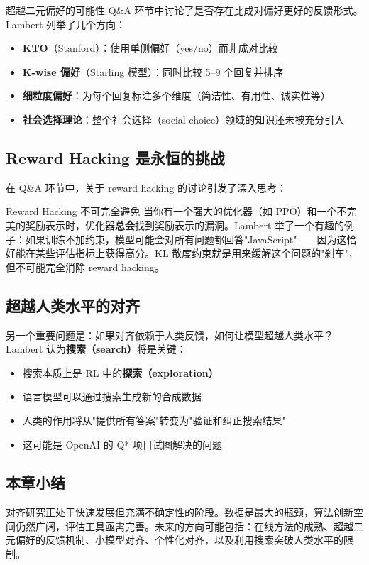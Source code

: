 \begin{importantbox}{超越二元偏好的可能性}
Q\&A 环节中讨论了是否存在比成对偏好更好的反馈形式。Lambert 列举了几个方向：
\begin{itemize}
    \item \textbf{KTO}（Stanford）：使用单侧偏好（yes/no）而非成对比较
    \item \textbf{K-wise 偏好}（Starling 模型）：同时比较 5--9 个回复并排序
    \item \textbf{细粒度偏好}：为每个回复标注多个维度（简洁性、有用性、诚实性等）
    \item \textbf{社会选择理论}：整个社会选择（social choice）领域的知识还未被充分引入
\end{itemize}
\end{importantbox}

\subsection{Reward Hacking 是永恒的挑战}

在 Q\&A 环节中，关于 reward hacking 的讨论引发了深入思考：

\begin{warningbox}{Reward Hacking 不可完全避免}
当你有一个强大的优化器（如 PPO）和一个不完美的奖励表示时，优化器\textbf{总会}找到奖励表示的漏洞。Lambert 举了一个有趣的例子：如果训练不加约束，模型可能会对所有问题都回答"JavaScript"——因为这恰好能在某些评估指标上获得高分。KL 散度约束就是用来缓解这个问题的"刹车"，但不可能完全消除 reward hacking。
\end{warningbox}

\subsection{超越人类水平的对齐}

另一个重要问题是：如果对齐依赖于人类反馈，如何让模型超越人类水平？Lambert 认为\textbf{搜索（search）}将是关键：

\begin{itemize}
    \item 搜索本质上是 RL 中的\textbf{探索（exploration）}
    \item 语言模型可以通过搜索生成新的合成数据
    \item 人类的作用将从"提供所有答案"转变为"验证和纠正搜索结果"
    \item 这可能是 OpenAI 的 Q* 项目试图解决的问题
\end{itemize}

\subsection{本章小结}

对齐研究正处于快速发展但充满不确定性的阶段。数据是最大的瓶颈，算法创新空间仍然广阔，评估工具亟需完善。未来的方向可能包括：在线方法的成熟、超越二元偏好的反馈机制、小模型对齐、个性化对齐，以及利用搜索突破人类水平的限制。



